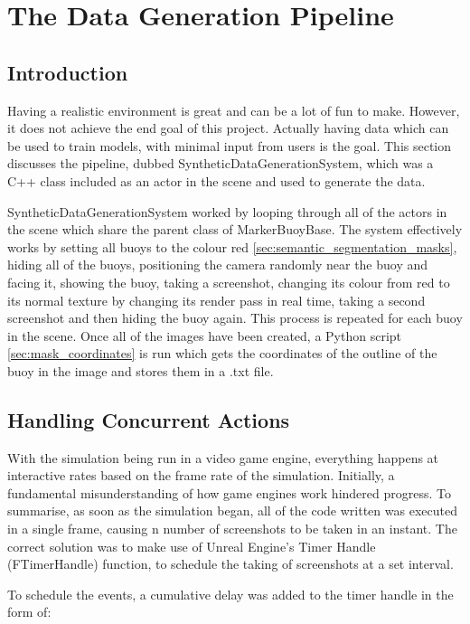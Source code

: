 \documentclass[10pt,twocolumn,letterpaper]{article}
\begin{document}
\section{The Data Generation Pipeline}

\subsection{Introduction}

Having a realistic environment is great and can be a lot of fun to make. However, it does not achieve the end goal of this project. Actually having data which can be used to train models, with minimal input from users is the goal. This section discusses the pipeline, dubbed SyntheticDataGenerationSystem, which was a C++ class included as an actor in the scene and used to generate the data.

SyntheticDataGenerationSystem worked by looping through all of the actors in the scene which share the parent class of MarkerBuoyBase. The system effectively works by setting all buoys to the colour red \ref{sec:semantic_segmentation_masks}, hiding all of the buoys, positioning the camera randomly near the buoy and facing it, showing the buoy, taking a screenshot, changing its colour from red to its normal texture by changing its render pass in real time, taking a second screenshot and then hiding the buoy again. This process is repeated for each buoy in the scene. Once all of the images have been created, a Python script \ref{sec:mask_coordinates} is run which gets the coordinates of the outline of the buoy in the image and stores them in a .txt file.

\subsection{Handling Concurrent Actions} \label {sec:handling_concurrent_actions}

With the simulation being run in a video game engine, everything happens at interactive rates based on the frame rate of the simulation. Initially, a fundamental misunderstanding of how game engines work hindered progress. To summarise, as soon as the simulation began, all of the code written was executed in a single frame, causing n number of screenshots to be taken in an instant. The correct solution was to make use of Unreal Engine's Timer Handle (FTimerHandle) function, to schedule the taking of screenshots at a set interval.

To schedule the events, a cumulative delay was added to the timer handle in the form of:
\end{document}
